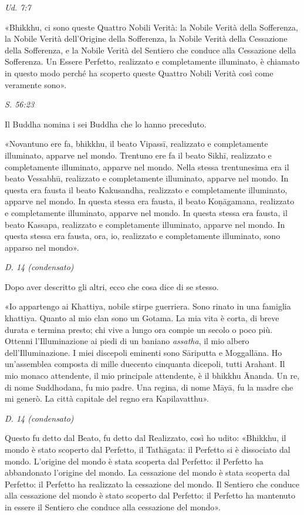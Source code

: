\emph{Ud. 7:7}


«Bhikkhu, ci sono queste Quattro Nobili Verità: la Nobile Verità della
Sofferenza, la Nobile Verità dell’Origine della Sofferenza, la Nobile
Verità della Cessazione della Sofferenza, e la Nobile Verità del
Sentiero che conduce alla Cessazione della Sofferenza. Un Essere
Perfetto, realizzato e completamente illuminato, è chiamato in questo
modo perché ha scoperto queste Quattro Nobili Verità così come veramente
sono».


\emph{S. 56:23}


 Il Buddha nomina i sei Buddha che lo hanno preceduto.


 «Novantuno ere fa, bhikkhu, il beato Vipassī, realizzato e
completamente illuminato, apparve nel mondo. Trentuno ere fa il beato
Sikhī, realizzato e completamente illuminato, apparve nel mondo. Nella
stessa trentunesima era il beato Vessabhū, realizzato e completamente
illuminato, apparve nel mondo. In questa era fausta il beato Kakusandha,
realizzato e completamente illuminato, apparve nel mondo. In questa
stessa era fausta, il beato Koṇāgamana, realizzato e completamente
illuminato, apparve nel mondo. In questa stessa era fausta, il beato
Kassapa, realizzato e completamente illuminato, apparve nel mondo. In
questa stessa era fausta, ora, io, realizzato e completamente
illuminato, sono apparso nel mondo».


\emph{D. 14 (condensato)}


 Dopo aver descritto gli altri, ecco che cosa dice di se
stesso.


 «Io appartengo ai Khattiya, nobile stirpe guerriera. Sono
rinato in una famiglia khattiya. Quanto al mio clan sono un Gotama. La
mia vita è corta, di breve durata e termina presto; chi vive a lungo ora
compie un secolo o poco più. Ottenni l’Illuminazione ai piedi di un
baniano \emph{assatha}, il mio albero dell’Illuminazione. I miei discepoli
eminenti sono Sāriputta e Moggallāna. Ho un’assemblea composta di
mille duecento cinquanta dicepoli, tutti Arahant. Il mio monaco
attendente, il mio principale attendente, è il bhikkhu Ānanda. Un re, di
nome Suddhodana, fu mio padre. Una regina, di nome Māyā, fu la madre che
mi generò. La città capitale del regno era Kapilavatthu».


\emph{D. 14 (condensato)}


Questo fu detto dal Beato, fu detto dal Realizzato, così ho udito:
«Bhikkhu, il mondo è stato scoperto dal Perfetto, il Tathāgata: il
Perfetto si è dissociato dal mondo. L’origine del mondo è stata scoperta
dal Perfetto: il Perfetto ha abbandonato l’origine del mondo. La
cessazione del mondo è stata scoperta dal Perfetto: il Perfetto ha
realizzato la cessazione del mondo. Il Sentiero che conduce alla
cessazione del mondo è stato scoperto dal Perfetto: il Perfetto ha
mantenuto in essere il Sentiero che conduce alla cessazione del mondo».


